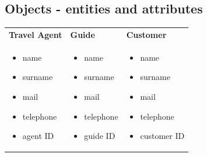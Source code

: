 \documentclass{article}
\begin{document}
\subsection{Objects - entities and attributes}
    \bigskip
    \begin{tabular}{p{}p{}p{}}
        \textbf{Travel Agent} & \textbf{Guide} & \textbf{Customer}\\
        \begin{itemize}
            \item name
            \item surname
            \item mail
            \item telephone
            \item agent ID
        \end{itemize} & \begin{itemize}
            \item name
            \item surname
            \item mail
            \item telephone
            \item guide ID
        \end{itemize} & \begin{itemize}
            \item name
            \item surname
            \item mail
            \item telephone
            \item customer ID
        \end{itemize}\\
    \end{tabular}
\end{document}
